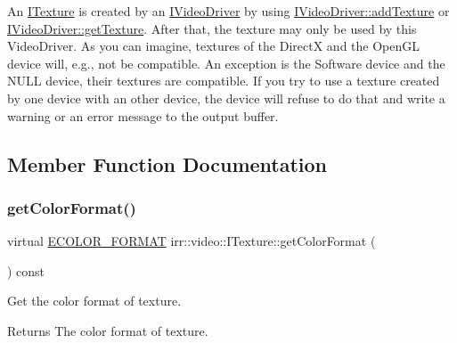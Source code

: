 An \hyperlink{classirr_1_1video_1_1ITexture}{I\+Texture} is created by an \hyperlink{classirr_1_1video_1_1IVideoDriver}{I\+Video\+Driver} by using \hyperlink{classirr_1_1video_1_1IVideoDriver_a8c02ee280bb738cdf38b77e7a798244e}{I\+Video\+Driver\+::add\+Texture} or \hyperlink{classirr_1_1video_1_1IVideoDriver_af4055165190e4adf221c6dc6f2434ea0}{I\+Video\+Driver\+::get\+Texture}. After that, the texture may only be used by this Video\+Driver. As you can imagine, textures of the DirectX and the Open\+GL device will, e.\+g., not be compatible. An exception is the Software device and the N\+U\+LL device, their textures are compatible. If you try to use a texture created by one device with an other device, the device will refuse to do that and write a warning or an error message to the output buffer. 

\subsection{Member Function Documentation}
\mbox{\label{classirr_1_1video_1_1ITexture_a48bbc0208c046724fc3264406f774132}} 
\subsubsection{\texorpdfstring{get\+Color\+Format()}{getColorFormat()}}
{\footnotesize\ttfamily virtual \hyperlink{namespaceirr_1_1video_a1d5e487888c32b1674a8f75116d829ed}{E\+C\+O\+L\+O\+R\+\_\+\+F\+O\+R\+M\+AT} irr\+::video\+::\+I\+Texture\+::get\+Color\+Format (\begin{DoxyParamCaption}{ }\end{DoxyParamCaption}) const\hspace{0.3cm}{\ttfamily [pure virtual]}}



Get the color format of texture. 

\begin{DoxyReturn}{Returns}
The color format of texture. 
\end{DoxyReturn}
\mbox{\label{classirr_1_1video_1_1ITexture_a4c6abdc0c789e6022e4e1b8a06cfab71}} 
